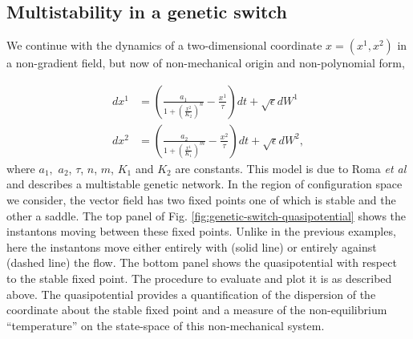 \subsection{Multistability in a genetic switch}

We continue with the dynamics of a two-dimensional coordinate $x=(x^{1},x^{2})$
in a non-gradient field, but now of non-mechanical origin and non-polynomial
form,

\begin{equation}
\begin{aligned}dx^{1} & =\left(\frac{a_{1}}{1+\left(\frac{x^{2}}{K_{2}}\right)^{n}}-\frac{x^{1}}{\tau}\right)dt+\sqrt{\epsilon}dW^{1}\\
dx^{2} & =\left(\frac{a_{2}}{1+\left(\frac{x^{1}}{K_{1}}\right)^{m}}-\frac{x^{2}}{\tau}\right)dt+\sqrt{\epsilon}dW^{2},
\end{aligned}
\label{eq:genetic-switch}
\end{equation}
where $a_{1},$ $a_{2}$, $\tau$, $n$, $m$, $K_{1}$ and $K_{2}$
are constants. This model is due to Roma \emph{et al} \citep{roma2005optimal}
and describes a multistable genetic network. In the region of configuration
space we consider, the vector field has two fixed points one of which
is stable and the other a saddle. The top panel of Fig. \ref{fig:genetic-switch-quasipotential}
shows the instantons moving between these fixed points. Unlike in
the previous examples, here the instantons move either entirely with
(solid line) or entirely against (dashed line) the flow. The bottom
panel shows the quasipotential with respect to the stable fixed point.
The procedure to evaluate and plot it is as described above. The quasipotential
provides a quantification of the dispersion of the coordinate about
the stable fixed point and a measure of the non-equilibrium ``temperature''
on the state-space of this non-mechanical system. 

